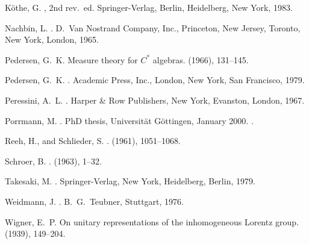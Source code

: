 \documentclass[a4paper,a4paper]{article}
\numberwithin{equation}{section}
\theoremstyle{definition}
\theoremstyle{plain}
\theoremstyle{remark}
\begin{document}
\begin{thebibliography}{10}
{\sc K\"othe, G.}
, 2nd rev.~ed.
\newblock Springer-Verlag, Berlin, Heidelberg, New York, 1983.

{\sc Nachbin, L.}
.
\newblock D.~Van Nostrand Company, Inc., Princeton, New Jersey, Toronto, New
  York, London, 1965.

{\sc Pedersen, G.~K.}
\newblock Measure theory for {$C^*$} algebras.
 (1966), 131--145.

{\sc Pedersen, G.~K.}
.
\newblock Academic Press, Inc., London, New York, San Francisco, 1979.

{\sc Peressini, A.~L.}
.
\newblock Harper \& Row Publishers, New York, Evanston, London, 1967.

{\sc Porrmann, M.}
.
\newblock PhD thesis, Universit\"at G\"ottingen, January 2000.
.

{\sc Reeh, H., and Schlieder, S.}
.
 (1961), 1051--1068.

{\sc Schroer, B.}
.
 (1963), 1--32.

{\sc Takesaki, M.}
.
\newblock Springer-Verlag, New York, Heidelberg, Berlin, 1979.

{\sc Weidmann, J.}
.
\newblock B.~G.~Teubner, Stuttgart, 1976.

{\sc Wigner, E.~P.}
\newblock On unitary representations of the inhomogeneous {Lorentz} group.
 (1939), 149--204.

\end{thebibliography}
  
\end{document}
